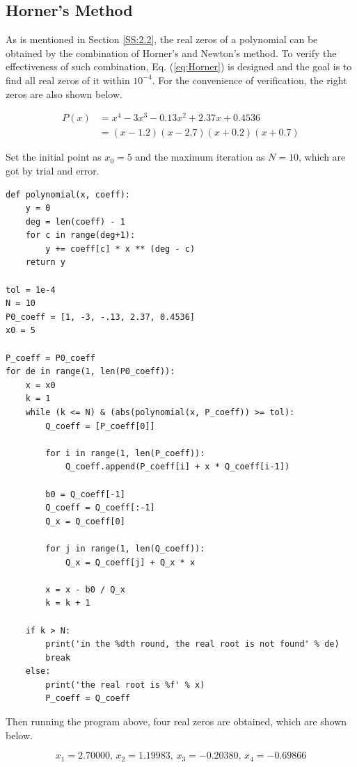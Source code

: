 \documentclass[preprint,12pt]{elsarticle}
\begin{document}
\subsection{Horner's Method}

As is mentioned in Section \ref{SS:2.2}, the real zeros of a polynomial can be obtained by the combination of Horner's and Newton's method. To verify the effectiveness of such combination, Eq. (\ref{eq:Horner}) is designed and the goal is to find all real zeros of it within $10^{-4}$. For the convenience of verification, the right zeros are also shown below.

\begin{equation}
\begin{split}
    P(x)&=x^4-3x^3-0.13x^2+2.37x+0.4536\\
    &=(x-1.2)(x-2.7)(x+0.2)(x+0.7)
\end{split}
\label{eq:Horner}
\end{equation}

Set the initial point as $x_0=5$ and the maximum iteration as $N=10$, which are got by trial and error. 

\begin{lstlisting}
def polynomial(x, coeff):
    y = 0
    deg = len(coeff) - 1
    for c in range(deg+1):
        y += coeff[c] * x ** (deg - c)
    return y

tol = 1e-4
N = 10
P0_coeff = [1, -3, -.13, 2.37, 0.4536]
x0 = 5

P_coeff = P0_coeff
for de in range(1, len(P0_coeff)):
    x = x0
    k = 1
    while (k <= N) & (abs(polynomial(x, P_coeff)) >= tol):
        Q_coeff = [P_coeff[0]]

        for i in range(1, len(P_coeff)):
            Q_coeff.append(P_coeff[i] + x * Q_coeff[i-1])

        b0 = Q_coeff[-1]
        Q_coeff = Q_coeff[:-1]
        Q_x = Q_coeff[0]

        for j in range(1, len(Q_coeff)):
            Q_x = Q_coeff[j] + Q_x * x

        x = x - b0 / Q_x
        k = k + 1

    if k > N:
        print('in the %dth round, the real root is not found' % de)
        break
    else:
        print('the real root is %f' % x)
        P_coeff = Q_coeff
\end{lstlisting}

Then running the program above, four real zeros are obtained, which are shown below.

$$
x_1=2.70000, \,x_2=1.19983, \,x_3=-0.20380, \,x_4=-0.69866
$$
\end{document}
